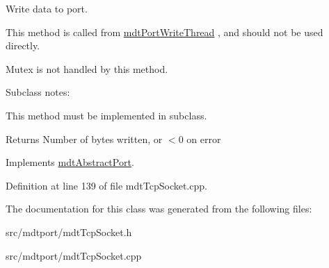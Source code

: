 Write data to port. 

This method is called from \hyperlink{classmdt_port_write_thread}{mdtPortWriteThread} , and should not be used directly.

Mutex is not handled by this method.

Subclass notes:\par
 This method must be implemented in subclass.\par


\begin{DoxyReturn}{Returns}
Number of bytes written, or $<$0 on error 
\end{DoxyReturn}


Implements \hyperlink{classmdt_abstract_port_a64d4802975a76474b9196c91f57a6d90}{mdtAbstractPort}.



Definition at line 139 of file mdtTcpSocket.cpp.



The documentation for this class was generated from the following files:\begin{DoxyCompactItemize}
\item 
src/mdtport/mdtTcpSocket.h\item 
src/mdtport/mdtTcpSocket.cpp\end{DoxyCompactItemize}
